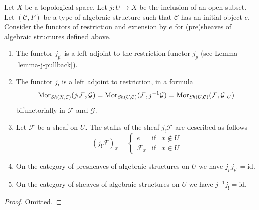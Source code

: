 \begin{lemma}
\label{lemma-j-shriek-structures}
Let $X$ be a topological space.
Let $j : U \to X$ be the inclusion of an open subset.
Let $(\mathcal{C}, F)$ be a type of algebraic structure
such that $\mathcal{C}$ has an initial object $e$.
Consider the functors of restriction and extension
by $e$ for (pre)sheaves of algebraic structures defined above.
\begin{enumerate}
\item The functor $j_{p!}$ is a left adjoint to the
restriction functor $j_p$ (see Lemma \ref{lemma-j-pullback}).
\item The functor $j_!$ is a left adjoint to restriction,
in a formula
$$
\mathop{\mathrm{Mor}}\nolimits_{\mathop{\mathit{Sh}}\nolimits(X, \mathcal{C})}(j_!\mathcal{F}, \mathcal{G})
=
\mathop{\mathrm{Mor}}\nolimits_{\mathop{\mathit{Sh}}\nolimits(U, \mathcal{C})}(\mathcal{F}, j^{-1}\mathcal{G})
=
\mathop{\mathrm{Mor}}\nolimits_{\mathop{\mathit{Sh}}\nolimits(U, \mathcal{C})}(\mathcal{F}, \mathcal{G}|_U)
$$
bifunctorially in $\mathcal{F}$ and $\mathcal{G}$.
\item Let $\mathcal{F}$ be a sheaf on $U$.
The stalks of the sheaf $j_!\mathcal{F}$ are described
as follows
$$
(j_{!}\mathcal{F})_x =
\left\{
\begin{matrix}
e & \text{if} & x \not \in U \\
\mathcal{F}_x & \text{if} & x \in U
\end{matrix}
\right.
$$
\item On the category of presheaves of algebraic structures on $U$
we have $j_pj_{p!} = \text{id}$.
\item On the category of sheaves of algebraic structures on $U$
we have $j^{-1}j_! = \text{id}$.
\end{enumerate}
\end{lemma}

\begin{proof}
Omitted.
\end{proof}

